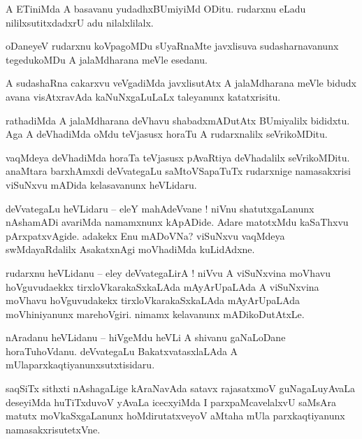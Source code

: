 \documentclass{article}
\begin{document}
\begin{mn}%
A ETiniMda A basavanu yudadhxBUmiyiMd ODitu. rudarxnu eLadu nililxsutitxdadxrU adu nilalxlilalx.
\end{mn}

\begin{mn}%
oDaneyeV rudarxnu koVpagoMDu sUyaRnaMte javxlisuva sudasharnavanunx tegedukoMDu A jalaMdharana 
meVle esedanu.
\end{mn}

\begin{mn}%
A sudashaRna cakarxvu veVgadiMda javxlisutAtx A jalaMdharana meVle bidudx avana visAtxravAda 
kaNuNxgaLuLaLx taleyanunx katatxrisitu.
\end{mn}

\begin{mn}%
rathadiMda A jalaMdharana deVhavu shabadxmADutAtx BUmiyalilx bididxtu. Aga A deVhadiMda oMdu 
teVjasusx horaTu A rudarxnalilx seVrikoMDitu.
\end{mn}

\begin{mn}%
vaqMdeya deVhadiMda horaTa teVjasusx pAvaRtiya deVhadalilx seVrikoMDitu. anaMtara barxhAmxdi 
deVvategaLu saMtoVSapaTuTx rudarxnige namasakxrisi viSuNxvu mADida kelasavanunx heVLidaru.
\end{mn}

\begin{mn}%
deVvategaLu heVLidaru -- eleY mahAdeVvane ! niVnu shatutxgaLanunx nAshamADi avariMda namamxnunx 
kApADide. Adare matotxMdu kaSaThxvu pArxpatxvAgide. adakekx Enu mADoVNa? viSuNxvu vaqMdeya 
swMdayaRdalilx AsakatxnAgi moVhadiMda kuLidAdxne.
\end{mn}

\begin{mn}%
rudarxnu heVLidanu -- eley deVvategaLirA ! niVvu A viSuNxvina moVhavu hoVguvudaekkx 
tirxloVkarakaSxkaLAda mAyArUpaLAda A viSuNxvina moVhavu hoVguvudakekx tirxloVkarakaSxkaLAda 
mAyArUpaLAda moVhiniyanunx marehoVgiri. nimamx kelavanunx mADikoDutAtxLe.
\end{mn}

\begin{mn}%
nAradanu heVLidanu -- hiVgeMdu heVLi A shivanu gaNaLoDane horaTuhoVdanu. deVvategaLu 
BakatxvatasxlaLAda A mUlaparxkaqtiyanunxsutxtisidaru.
\end{mn}

\begin{mn}%
saqSiTx sithxti nAshagaLige kAraNavAda satavx rajasatxmoV guNagaLuyAvaLa deseyiMda huTiTxduvoV 
yAvaLa icecxyiMda I parxpaMcavelalxvU saMsAra matutx moVkaSxgaLanunx hoMdirutatxveyoV aMtaha mUla 
parxkaqtiyanunx namasakxrisutetxVne.
\end{mn}
\end{document}
